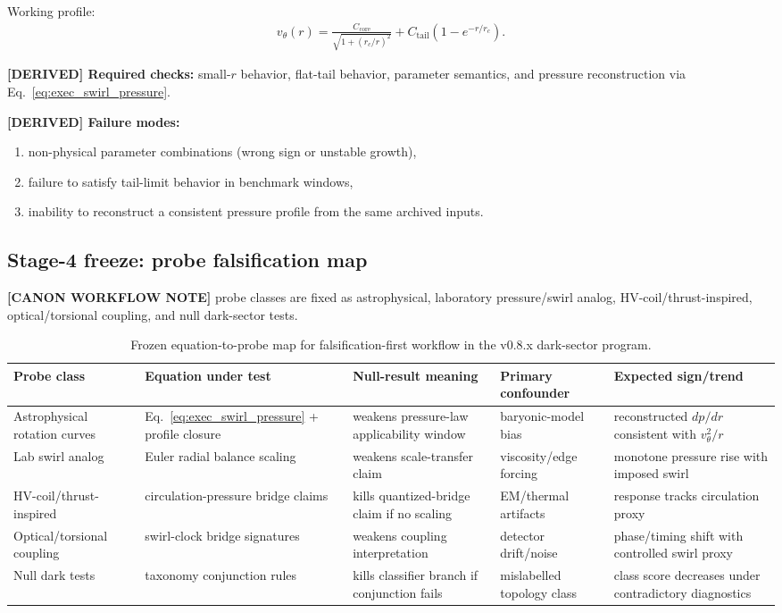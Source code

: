 Working profile:
\begin{align}
    v_\theta(r)
    =
    \frac{C_{\mathrm{core}}}{\sqrt{1+(r_c/r)^2}}
    +
    C_{\mathrm{tail}}\left(1-e^{-r/r_c}\right).
\end{align}

\textbf{[DERIVED] Required checks:}
small-$r$ behavior, flat-tail behavior, parameter semantics, and pressure reconstruction via Eq.~\eqref{eq:exec_swirl_pressure}.

\textbf{[DERIVED] Failure modes:}
\begin{enumerate}
    \item non-physical parameter combinations (wrong sign or unstable growth),
    \item failure to satisfy tail-limit behavior in benchmark windows,
    \item inability to reconstruct a consistent pressure profile from the same archived inputs.
\end{enumerate}

\subsection{Stage-4 freeze: probe falsification map}
\textbf{[CANON WORKFLOW NOTE]} probe classes are fixed as astrophysical, laboratory pressure/swirl analog, HV-coil/thrust-inspired, optical/torsional coupling, and null dark-sector tests.

\begin{table}[h]
\centering
\begin{tabular}{p{2.7cm}p{3.1cm}p{2.5cm}p{2.2cm}p{2.2cm}}
\hline
Probe class & Equation under test & Null-result meaning & Primary confounder & Expected sign/trend \\
\hline
Astrophysical rotation curves & Eq.~\eqref{eq:exec_swirl_pressure} + profile closure & weakens pressure-law applicability window & baryonic-model bias & reconstructed $dp/dr$ consistent with $v_\theta^2/r$ \\
Lab swirl analog & Euler radial balance scaling & weakens scale-transfer claim & viscosity/edge forcing & monotone pressure rise with imposed swirl \\
HV-coil/thrust-inspired & circulation-pressure bridge claims & kills quantized-bridge claim if no scaling & EM/thermal artifacts & response tracks circulation proxy \\
Optical/torsional coupling & swirl-clock bridge signatures & weakens coupling interpretation & detector drift/noise & phase/timing shift with controlled swirl proxy \\
Null dark tests & taxonomy conjunction rules & kills classifier branch if conjunction fails & mislabelled topology class & class score decreases under contradictory diagnostics \\
\hline
\end{tabular}
\caption{Frozen equation-to-probe map for falsification-first workflow in the v0.8.x dark-sector program.}
\label{tab:exec-probe-map}
\end{table}

